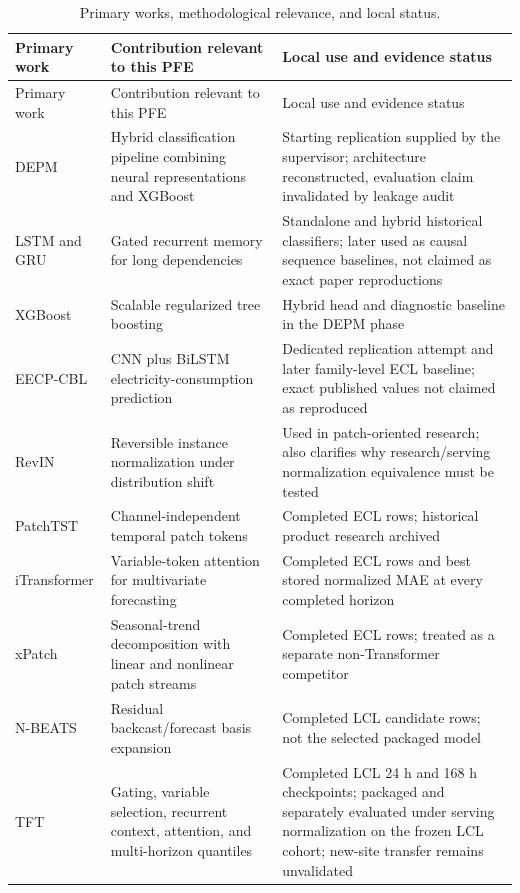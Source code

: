 \begin{longtable}{p{}p{}p{}}
\caption{Primary works, methodological relevance, and local status.}
\label{tab:paperreview}\\
\toprule
Primary work & Contribution relevant to this PFE & Local use and evidence status \\
\midrule
\endfirsthead
\toprule
Primary work & Contribution relevant to this PFE & Local use and evidence status \\
\midrule
\endhead
DEPM \cite{ragupathi2024depm} & Hybrid classification pipeline combining neural representations and XGBoost & Starting replication supplied by the supervisor; architecture reconstructed, evaluation claim invalidated by leakage audit \\
LSTM \cite{hochreiter1997lstm} and GRU \cite{cho2014gru} & Gated recurrent memory for long dependencies & Standalone and hybrid historical classifiers; later used as causal sequence baselines, not claimed as exact paper reproductions \\
XGBoost \cite{chen2016xgboost} & Scalable regularized tree boosting & Hybrid head and diagnostic baseline in the DEPM phase \\
EECP-CBL \cite{le2019eecpcbl} & CNN plus BiLSTM electricity-consumption prediction & Dedicated replication attempt and later family-level ECL baseline; exact published values not claimed as reproduced \\
RevIN \cite{kim2022revin} & Reversible instance normalization under distribution shift & Used in patch-oriented research; also clarifies why research/serving normalization equivalence must be tested \\
PatchTST \cite{nie2023patchtst} & Channel-independent temporal patch tokens & Completed ECL rows; historical product research archived \\
iTransformer \cite{liu2024itransformer} & Variable-token attention for multivariate forecasting & Completed ECL rows and best stored normalized MAE at every completed horizon \\
xPatch \cite{stitsyuk2025xpatch} & Seasonal-trend decomposition with linear and nonlinear patch streams & Completed ECL rows; treated as a separate non-Transformer competitor \\
N-BEATS \cite{oreshkin2020nbeats} & Residual backcast/forecast basis expansion & Completed LCL candidate rows; not the selected packaged model \\
TFT \cite{lim2021tft} & Gating, variable selection, recurrent context, attention, and multi-horizon quantiles & Completed LCL 24 h and 168 h checkpoints; packaged and separately evaluated under serving normalization on the frozen LCL cohort; new-site transfer remains unvalidated \\

\end{longtable}
